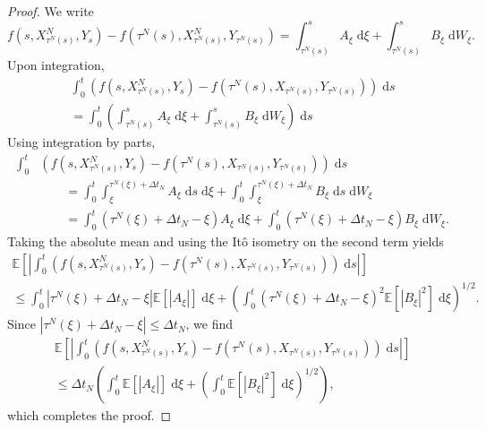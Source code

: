 \documentclass[reqno,12pt]{amsart}
\theoremstyle{plain}%
\theoremstyle{definition}
\begin{document}
\begin{proof}
    We write
    \[
        f(s, X_{\tau^N(s)}^N, Y_s) - f(\tau^N(s), X_{\tau^N(s)}^N, Y_{\tau^N(s)}) = \int_{\tau^N(s)}^s A_\xi \;\mathrm{d}\xi + \int_{\tau^N(s)}^s B_\xi \;\mathrm{d}W_\xi.
    \]
    Upon integration,
    \begin{multline*}
        \int_0^t \left(f(s, X_{\tau^N(s)}^N, Y_s) - f(\tau^N(s), X_{\tau^N(s)}, Y_{\tau^N(s)})\right)\;\mathrm{d}s  \\
        = \int_0^t \left(\int_{\tau^N(s)}^s A_\xi \;\mathrm{d}\xi + \int_{\tau^N(s)}^s B_\xi \;\mathrm{d}W_\xi\right)\;\mathrm{d}s
    \end{multline*}
    Using integration by parts,
    \begin{align*}
        \int_0^t & \left(f(s, X_{\tau^N(s)}^N, Y_s) - f(\tau^N(s), X_{\tau^N(s)}, Y_{\tau^N(s)})\right)\;\mathrm{d}s \\
        & \qquad = \int_0^t \int_\xi^{\tau^N(\xi)+\Delta t_N} A_\xi \;\mathrm{d}s\;\mathrm{d}\xi + \int_0^t \int_\xi^{\tau^N(\xi) + \Delta t_N} B_\xi \;\mathrm{d}s\;\mathrm{d}W_\xi \\
        & \qquad = \int_0^t (\tau^N(\xi)+\Delta t_N - \xi) A_\xi \;\mathrm{d}\xi + \int_0^t (\tau^N(\xi) + \Delta t_N - \xi) B_\xi \;\mathrm{d}W_\xi.
    \end{align*}
    Taking the absolute mean and using the It\^o isometry on the second term yields
    \begin{multline*}
        \mathbb{E}\left[\left|\int_0^t \left(f(s, X_{\tau^N(s)}^N, Y_s) - f(\tau^N(s), X_{\tau^N(s)}, Y_{\tau^N(s)})\right)\;\mathrm{d}s\right|\right]  \\
        \leq \int_0^t |\tau^N(\xi)+\Delta t_N - \xi| \mathbb{E}[|A_\xi|] \;\mathrm{d}\xi + \left(\int_0^t (\tau^N(\xi) + \Delta t_N - \xi)^2 \mathbb{E}[|B_\xi|^2] \;\mathrm{d}\xi \right)^{1/2}.
    \end{multline*}
    Since $|\tau^N(\xi)+\Delta t_N - \xi| \leq \Delta t_N$, we find
    \begin{multline*}
        \mathbb{E}\left[\left|\int_0^t \left(f(s, X_{\tau^N(s)}^N, Y_s) - f(\tau^N(s), X_{\tau^N(s)}, Y_{\tau^N(s)})\right)\;\mathrm{d}s\right|\right]  \\
        \leq \Delta t_N \left(\int_0^t \mathbb{E}[|A_\xi|] \;\mathrm{d}\xi + \left(\int_0^t \mathbb{E}[|B_\xi|^2] \;\mathrm{d}\xi \right)^{1/2}\right),
    \end{multline*}
    which completes the proof.
\end{proof}
\end{document}
